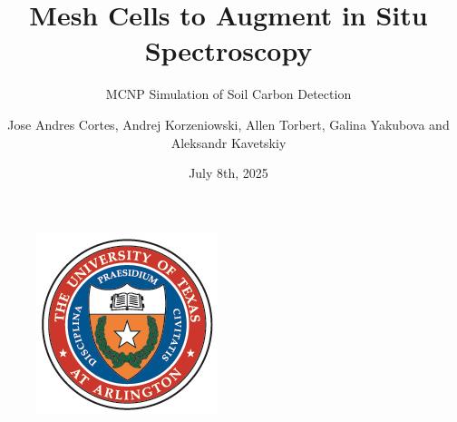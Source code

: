 \documentclass[10pt,hyperref={colorlinks,citecolor=blue,urlcolor=peking_blue,linkcolor=}]{beamer}
\author[Jose Andres Cortes]{Jose Andres Cortes, Andrej Korzeniowski, Allen Torbert, Galina Yakubova and Aleksandr Kavetskiy}
\title{Mesh Cells to Augment in Situ Spectroscopy}
\subtitle{MCNP Simulation of Soil Carbon Detection}
\institute{UT Arlington, USDA-ARS}
\date{July 8th, 2025}
\theoremstyle{plain}
\newif\ifplacelogo %
\begin{document}
{
\begin{frame}
    \titlepage
    \begin{figure}[htpb]
        \begin{center}
            \includegraphics[width=0.2\linewidth]{../Figures/Misc/UTASeal.png}
        \end{center}
    \end{figure}
\end{frame}
}

\placelogofalse
\end{document}
